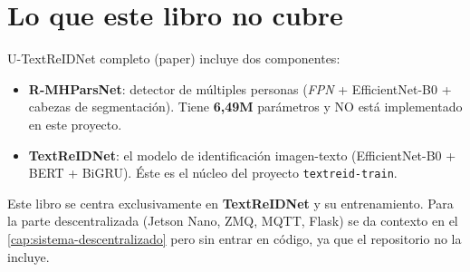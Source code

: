 \section{Lo que este libro no cubre}

U-TextReIDNet completo (paper) incluye dos componentes:

\begin{itemize}
  \item \textbf{R-MHParsNet}: detector de múltiples personas
        (\emph{FPN} + EfficientNet-B0 + cabezas de segmentación).
        Tiene \textbf{6,49M} parámetros y NO está implementado en
        este proyecto.
  \item \textbf{TextReIDNet}: el modelo de identificación
        imagen-texto (EfficientNet-B0 + BERT + BiGRU). Éste es el
        núcleo del proyecto \texttt{textreid-train}.
\end{itemize}

Este libro se centra exclusivamente en \textbf{TextReIDNet} y su
entrenamiento. Para la parte descentralizada (Jetson Nano, ZMQ,
MQTT, Flask) se da contexto en el \cref{cap:sistema-descentralizado}
pero sin entrar en código, ya que el repositorio no la incluye.
